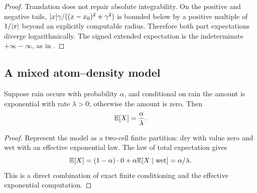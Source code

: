 \begin{proof}
Translation does not repair absolute integrability.  On the positive and
negative tails, \(\lvert x\rvert\gamma/((x-x_0)^2+\gamma^2)\) is bounded below by a
positive multiple of \(1/\lvert x\rvert\) beyond an explicitly computable radius.
Therefore both part expectations diverge logarithmically.  The signed
extended expectation is the indeterminate \(+\infty-\infty\), as in
.
\end{proof}

\subsection{A mixed atom--density model}

\begin{proposition}
\label{prop:precipitation}
Suppose rain occurs with probability \(\alpha\), and conditional on rain the
amount is exponential with rate \(\lambda>0\); otherwise the amount is zero.
Then
\[
 \mathbb E[X]=\frac{\alpha}{\lambda}.
\]
\end{proposition}

\begin{proof}
Represent the model as a two-cell finite partition: dry with value zero and
wet with an effective exponential law.  The law of total expectation gives
\[
 \mathbb E[X]=(1-\alpha)\cdot0
 +\alpha\mathbb E[X\mid\text{wet}]
 =\alpha/\lambda.
\]
This is a direct combination of exact finite conditioning and the effective
exponential computation.
\end{proof}
